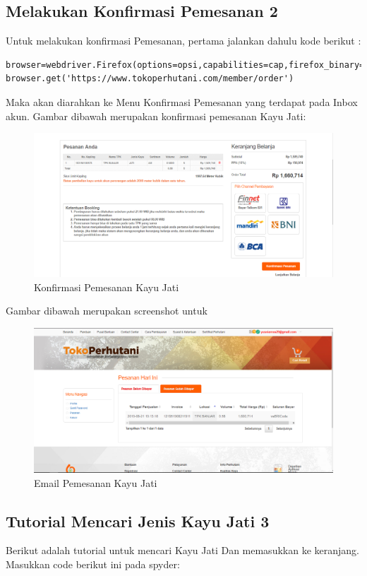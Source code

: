 \newpage
\subsection {Melakukan Konfirmasi Pemesanan 2}
Untuk melakukan konfirmasi Pemesanan, pertama jalankan dahulu kode berikut :
\begin{verbatim}
browser=webdriver.Firefox(options=opsi,capabilities=cap,firefox_binary=binary)
browser.get('https://www.tokoperhutani.com/member/order')
\end{verbatim}

Maka akan diarahkan ke Menu Konfirmasi Pemesanan yang terdapat pada Inbox akun.
Gambar dibawah merupakan konfirmasi pemesanan Kayu Jati:
\begin{figure}[h]
	\centering
	\includegraphics[scale=0.25]{figures/T6_1}
	\caption{Konfirmasi Pemesanan Kayu Jati}
\end{figure}

Gambar dibawah merupakan screenshot untuk
\begin{figure}[h]
	\centering
	\includegraphics[scale=0.25]{figures/T6_2}
	\caption{Email Pemesanan Kayu Jati}
\end{figure}

\newpage
\subsection{Tutorial Mencari Jenis Kayu Jati 3}
Berikut adalah tutorial untuk mencari Kayu Jati Dan memasukkan ke keranjang. Masukkan code berikut ini pada spyder:


